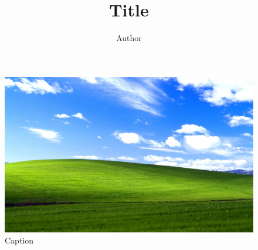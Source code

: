 \documentclass[11pt]{vanilla}
\title{Title}
\author{Author}
\begin{document}
\maketitle

\lipsum{}

\begin{figure}[ht!]
    \centering
    \includegraphics[width=\textwidth]{bliss.jpg}
    \caption{Caption \lipsum[1]}
\end{figure}
\end{document}
